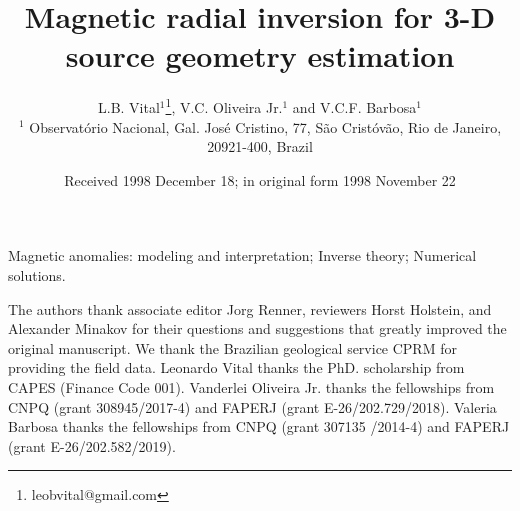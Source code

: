 \documentclass[extra,mreferee]{gji}
\title[Geophys.\ J.\ Int.: Magnetic radial inversion]
  {Magnetic radial inversion for 3-D source geometry estimation}
\author[L.B. Vital, V.C. Oliveira Jr. and V.C.F. Barbosa]
  {L.B. Vital$^1$\thanks{leobvital@gmail.com}, 
  V.C. Oliveira Jr.$^1$ and V.C.F. Barbosa$^1$\\
  $^1$ Observat{\'o}rio Nacional, Gal. Jos{\'e} Cristino, 77, São Crist{\'o}v{\~a}o,
  Rio de Janeiro, 20921-400, Brazil
  }
\date{Received 1998 December 18; in original form 1998 November 22}
\begin{document}
\label{firstpage}

\maketitle



\begin{keywords}
 Magnetic anomalies: modeling and interpretation; Inverse theory; Numerical solutions.
\end{keywords}











\begin{acknowledgments}
The authors thank associate editor Jorg Renner, reviewers Horst Holstein, and Alexander Minakov 
for their questions and suggestions that greatly improved the original manuscript.	
We thank the Brazilian geological service CPRM for providing the field data. 
Leonardo Vital thanks the PhD. scholarship from CAPES (Finance Code 001). 
Vanderlei Oliveira Jr. thanks the fellowships from CNPQ (grant 308945/2017-4) and 
FAPERJ (grant E-26/202.729/2018).  
Valeria Barbosa thanks the fellowships from CNPQ (grant 307135 /2014-4) and 
FAPERJ (grant E-26/202.582/2019).
\end{acknowledgments}






\appendix

\label{lastpage}
\end{document}
